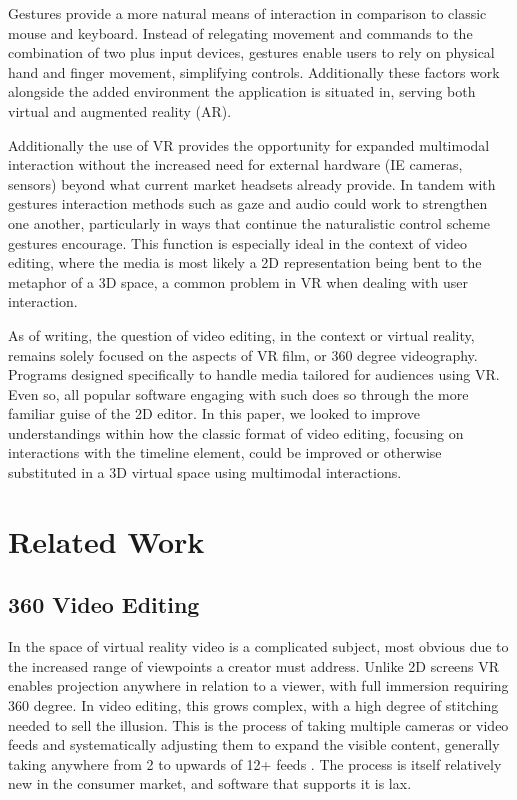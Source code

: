 \documentclass[manuscript, review]{acmart}
\begin{document}
Gestures provide a more natural means of interaction in comparison to classic mouse and keyboard. Instead of relegating movement and commands to the combination of two plus input devices, gestures enable users to rely on physical hand and finger movement, simplifying controls. Additionally these factors work alongside the added environment the application is situated in, serving both virtual and augmented reality (AR).

Additionally the use of VR provides the opportunity for expanded multimodal interaction without the increased need for external hardware (IE cameras, sensors) beyond what current market headsets already provide. In tandem with gestures interaction methods such as gaze and audio could work to strengthen one another, particularly in ways that continue the naturalistic control scheme gestures encourage. This function is especially ideal in the context of video editing, where the media is most likely a 2D representation being bent to the metaphor of a 3D space, a common problem in VR when dealing with user interaction.

As of writing, the question of video editing, in the context or virtual reality, remains solely focused on the aspects of VR film, or 360 degree videography. Programs designed specifically to handle media tailored for audiences using VR. Even so, all popular software engaging with such does so through the more familiar guise of the 2D editor. In this paper, we looked to improve understandings within how the classic format of video editing, focusing on interactions with the timeline element, could be improved or otherwise substituted in a 3D virtual space using multimodal interactions.


\section{Related Work}

\subsection{360 Video Editing}

In the space of virtual reality video is a complicated subject, most obvious due to the increased range of viewpoints a creator must address. Unlike 2D screens VR enables projection anywhere in relation to a viewer, with full immersion requiring 360 degree. In video editing, this grows complex, with a high degree of stitching needed to sell the illusion. This is the process of taking multiple cameras or video feeds and systematically adjusting them to expand the visible content, generally taking anywhere from 2 to upwards of 12+ feeds \cite{LeirpollJarle2017VVE}. The process is itself relatively new in the consumer market, and software that supports it is lax.
\end{document}
